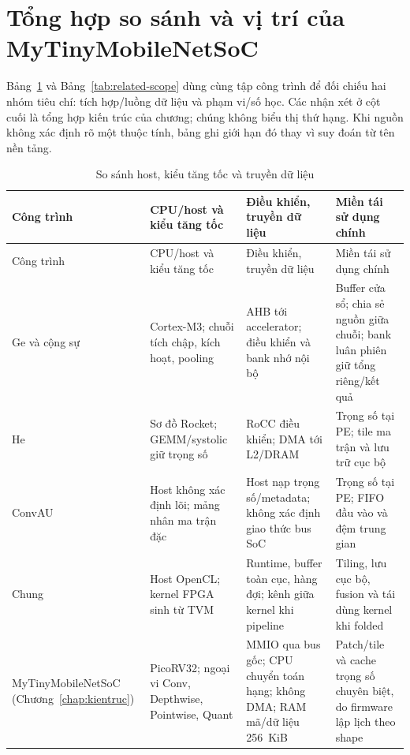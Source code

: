 \section{Tổng hợp so sánh và vị trí của MyTinyMobileNetSoC}
\label{sec:related-position}
Bảng~\ref{tab:related-integration} và Bảng~\ref{tab:related-scope} dùng cùng tập công trình để đối chiếu hai nhóm tiêu chí: tích hợp/luồng dữ liệu và phạm vi/số học. Các nhận xét ở cột cuối là tổng hợp kiến trúc của chương; chúng không biểu thị thứ hạng. Khi nguồn không xác định rõ một thuộc tính, bảng ghi giới hạn đó thay vì suy đoán từ tên nền tảng.

\begingroup
\small
\setlength{\tabcolsep}{4pt}
\renewcommand{\arraystretch}{1.12}
\begin{longtable}{@{}>{\raggedright\arraybackslash}p{}>{\raggedright\arraybackslash}p{}>{\raggedright\arraybackslash}p{}>{\raggedright\arraybackslash}p{}@{}}
\caption{So sánh host, kiểu tăng tốc và truyền dữ liệu}\label{tab:related-integration}\\
\toprule
Công trình & CPU/host và kiểu tăng tốc & Điều khiển, truyền dữ liệu & Miền tái sử dụng chính \\
\midrule
\endfirsthead
\toprule
Công trình & CPU/host và kiểu tăng tốc & Điều khiển, truyền dữ liệu & Miền tái sử dụng chính \\
\midrule
\endhead
\bottomrule
\endfoot
Ge và cộng sự~\cite{ge2019compact} & Cortex-M3; chuỗi tích chập, kích hoạt, pooling & AHB tới accelerator; điều khiển và bank nhớ nội bộ & Buffer cửa sổ; chia sẻ nguồn giữa chuỗi; bank luân phiên giữ tổng riêng/kết quả \\
\midrule
He~\cite{he2021design} & Sơ đồ Rocket; GEMM/systolic giữ trọng số & RoCC điều khiển; DMA tới L2/DRAM & Trọng số tại PE; tile ma trận và lưu trữ cục bộ \\
\midrule
ConvAU~\cite{kiningham2016design} & Host không xác định lõi; mảng nhân ma trận đặc & Host nạp trọng số/metadata; không xác định giao thức bus SoC & Trọng số tại PE; FIFO đầu vào và đệm trung gian \\
\midrule
Chung~\cite{chung2021optimization} & Host OpenCL; kernel FPGA sinh từ TVM & Runtime, buffer toàn cục, hàng đợi; kênh giữa kernel khi pipeline & Tiling, lưu cục bộ, fusion và tái dùng kernel khi folded \\
\midrule
MyTiny\-Mobile\-NetSoC (Chương~\ref{chap:kientruc}) & PicoRV32; ngoại vi Conv, Depthwise, Pointwise, Quant & MMIO qua bus gốc; CPU chuyển toán hạng; không DMA; RAM mã/dữ liệu 256~KiB & Patch/tile và cache trọng số chuyên biệt, do firmware lập lịch theo shape \\
\end{longtable}
\endgroup

